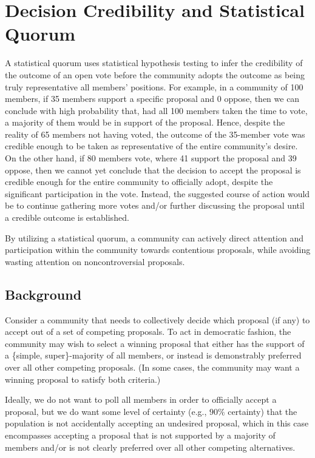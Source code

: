 \documentclass[format=acmsmall, review=true, screen=true, anonymous=true]{acmart}
\begin{document}
\section{Decision Credibility and Statistical Quorum}
\label{sec:decision-credibility}
A statistical quorum uses statistical hypothesis testing to infer the credibility of the outcome of an open vote before the community adopts the outcome as being truly representative all members' positions.
For example, in a community of 100 members, if 35 members support a specific proposal and 0 oppose, then we can conclude with high probability that, had all 100 members taken the time to vote, a majority of them would be in support of the proposal.  Hence, despite the reality of 65 members not having voted, the outcome of the 35-member vote was credible enough to be taken as representative of the entire community's desire.
On the other hand, if 80 members vote, where 41 support the proposal and 39 oppose, then we cannot yet conclude that the decision to accept the proposal is credible enough for the entire community to officially adopt, despite the significant participation in the vote.
Instead, the suggested course of action would be to continue gathering more votes and/or further discussing the proposal until a credible outcome is established.

By utilizing a statistical quorum, a community can actively direct attention and participation within the community towards contentious proposals, while avoiding wasting attention on noncontroversial proposals.

\subsection{Background}
Consider a community that needs to collectively decide which proposal (if any) to accept out of a set of competing proposals.
To act in democratic fashion, the community may wish to select a winning proposal that either has the support of a \{simple, super\}-majority of all members, or instead is demonstrably preferred over all other competing proposals.  (In some cases, the community may want a winning proposal to satisfy both criteria.)

Ideally, we do not want to poll all members in order to officially accept a proposal, but we do want some level of certainty (e.g., $90\%$ certainty) that
the population is not accidentally accepting an undesired proposal, which in this case encompasses accepting a proposal that is not supported by a majority of members and/or is not clearly preferred over all other competing alternatives.
\end{document}

